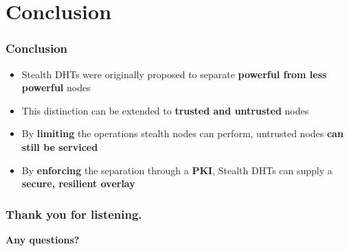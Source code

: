 \documentclass{beamer}
\begin{document}
\section{Conclusion}
\begin{frame}
  \frametitle{Conclusion}
  \begin{itemize}
  \item{Stealth DHTs were originally proposed to separate \textbf{powerful from less powerful} nodes}
  \item{This distinction can be extended to \textbf{trusted and untrusted} nodes}
  \item{By \textbf{limiting} the operations stealth nodes can perform, untrusted nodes \textbf{can still be serviced}}
  \item{By \textbf{enforcing} the separation through a \textbf{PKI}, Stealth DHTs can supply a \textbf{secure, resilient overlay}}
  \end{itemize}
\end{frame}

\begin{frame}
  \frametitle{Thank you for listening.}
  \begin{center}
    \textbf{Any questions?}
    \titlepage
  \end{center}
\end{frame}
\end{document}
